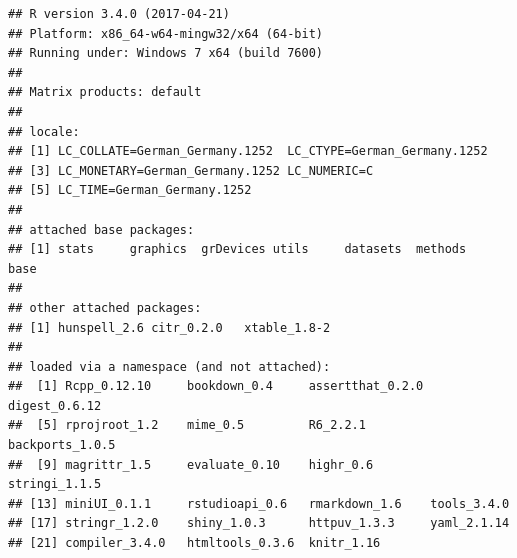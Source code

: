 \documentclass[]{book}
\theoremstyle{definition}
\theoremstyle{definition}
\theoremstyle{remark}
\begin{document}
\begin{verbatim}
## R version 3.4.0 (2017-04-21)
## Platform: x86_64-w64-mingw32/x64 (64-bit)
## Running under: Windows 7 x64 (build 7600)
## 
## Matrix products: default
## 
## locale:
## [1] LC_COLLATE=German_Germany.1252  LC_CTYPE=German_Germany.1252   
## [3] LC_MONETARY=German_Germany.1252 LC_NUMERIC=C                   
## [5] LC_TIME=German_Germany.1252    
## 
## attached base packages:
## [1] stats     graphics  grDevices utils     datasets  methods   base     
## 
## other attached packages:
## [1] hunspell_2.6 citr_0.2.0   xtable_1.8-2
## 
## loaded via a namespace (and not attached):
##  [1] Rcpp_0.12.10     bookdown_0.4     assertthat_0.2.0 digest_0.6.12   
##  [5] rprojroot_1.2    mime_0.5         R6_2.2.1         backports_1.0.5 
##  [9] magrittr_1.5     evaluate_0.10    highr_0.6        stringi_1.1.5   
## [13] miniUI_0.1.1     rstudioapi_0.6   rmarkdown_1.6    tools_3.4.0     
## [17] stringr_1.2.0    shiny_1.0.3      httpuv_1.3.3     yaml_2.1.14     
## [21] compiler_3.4.0   htmltools_0.3.6  knitr_1.16
\end{verbatim}


\end{document}

